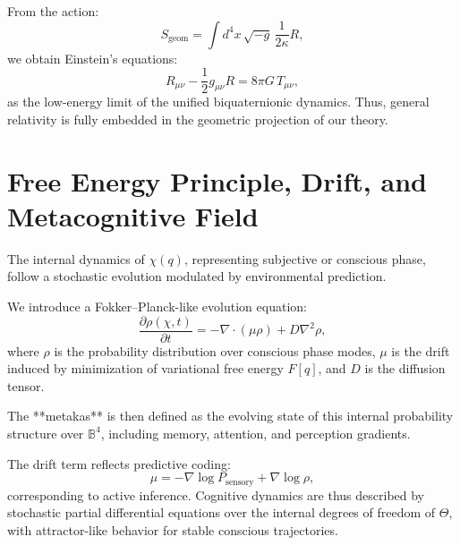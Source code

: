 \documentclass[12pt]{article}
\begin{document}
From the action:
\[
S_\text{geom} = \int d^4 x \, \sqrt{-g} \, \frac{1}{2\kappa} R,
\]
we obtain Einstein’s equations:
\[
R_{\mu\nu} - \frac{1}{2} g_{\mu\nu} R = 8 \pi G \, T_{\mu\nu},
\]
as the low-energy limit of the unified biquaternionic dynamics. Thus, general relativity is fully embedded in the geometric projection of our theory.


\section{Free Energy Principle, Drift, and Metacognitive Field}

The internal dynamics of \( \chi(q) \), representing subjective or conscious phase, follow a stochastic evolution modulated by environmental prediction.

We introduce a Fokker–Planck-like evolution equation:
\[
\frac{\partial \rho(\chi, t)}{\partial t} = -\nabla \cdot \left( \mu \rho \right) + D \nabla^2 \rho,
\]
where \( \rho \) is the probability distribution over conscious phase modes, \( \mu \) is the drift induced by minimization of variational free energy \( F[q] \), and \( D \) is the diffusion tensor.

The **metakas** is then defined as the evolving state of this internal probability structure over \( \mathbb{B}^4 \), including memory, attention, and perception gradients.

The drift term reflects predictive coding:
\[
\mu = -\nabla \log P_\text{sensory} + \nabla \log \rho,
\]
corresponding to active inference. Cognitive dynamics are thus described by stochastic partial differential equations over the internal degrees of freedom of \( \Theta \), with attractor-like behavior for stable conscious trajectories.
\end{document}
